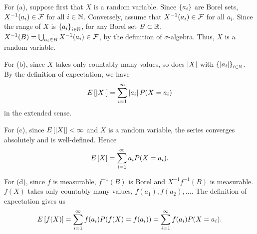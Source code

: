 \begin{solution}
    For (a), suppose first that $X$ is a random variable. Since $\left\{ {a_i} \right\}$ are 
    Borel sets, $X^{-1}(a_i)\in\mathcal{F}$ for all $i\in\mathbb{N}$. Conversely, assume that 
    $X^{-1}(a_i)\in\mathcal{F}$ for all $a_i$. Since the range of $X$ is $\left\{ {a_i} \right\}_{i\in\mathbb{N}}$, 
    for any Borel set $B\subset\mathbb{R}$, $X^{-1}(B) = \bigcup_{a_i\in B} X^{-1}(a_i)\in\mathcal{F}$, 
    by the definition of $\sigma$-algebra. Thus, $X$ is a random variable. 

    For (b), since $X$ takes only countably many values, so does $\left\lvert {X} \right\rvert$ with 
    $\left\{ {\left\lvert {a_i} \right\rvert} \right\}_{i\in\mathbb{N}}$. By the definition of expectation, we have 
    \begin{equation*}
        E\left[ {\left\lvert {X} \right\rvert} \right] = \sum_{i=1}^\infty \left\lvert {a_i} \right\rvert P(X = a_i)
    \end{equation*}
    in the extended sense. 

    For (c), since $E\left[ {\left\lvert {X} \right\rvert} \right] < \infty$ and $X$ is a random variable, 
    the series converges absolutely and is well-defined. Hence 
    \begin{equation*}
        E\left[ {X} \right] = \sum_{i=1}^\infty a_i P(X = a_i).
    \end{equation*}

    For (d), since $f$ is measurable, $f^{-1}(B)$ is Borel and $X^{-1}f^{-1}(B)$ 
    is measurable. $f(X)$ takes only countably many values, $f(a_1), f(a_2), \ldots$. 
    The definition of expectation gives us 
    \begin{equation*}
        E\left[ {f(X)} \right] = \sum_{i=1}^\infty f(a_i) P(f(X) = f(a_i)) = \sum_{i=1}^\infty f(a_i) P(X = a_i).
    \end{equation*}
\end{solution}

